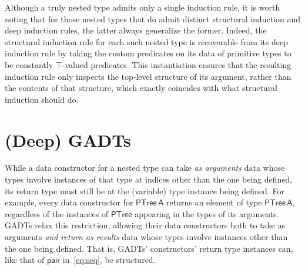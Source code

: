 \documentclass[9pt]{entcs}
\begin{document}
Although a truly nested type admits only a single induction rule, it
is worth noting that for those nested types that do admit distinct
structural induction and deep induction rules, the latter always
generalize the former. Indeed, the structural induction rule for each
such nested type is recoverable from its deep induction rule by taking
the custom predicates on its data of primitive types to be constantly
$\mathsf{\top}$-valued predicates. This instantiation ensures that the
resulting induction rule only inspects the top-level structure of its
argument, rather than the contents of that structure, which exactly
coincides with what structural induction should do.

\section{(Deep) GADTs}\label{sec:GADTs}

While a data constructor for a nested type can take {\em as arguments}
data whose types involve instances of that type at indices other than
the one being defined, its return type must still be at the (variable)
type instance being defined. For example, every data constructor for
$\mathsf{PTree\,A}$ returns an element of type
$\mathsf{PTree\,A}$, regardless of the instances of $\mathsf{PTree}$
appearing in the types of its arguments. GADTs relax this restriction,
allowing their data constructors both to take as arguments \emph{and
  return as results} data whose types involve instances other
than the one being defined. That is, GADTs' constructors' return type
instances can, like that of $\mathsf{pair}$ in~\eqref{eq:seq}, be
structured.
%
\end{document}
